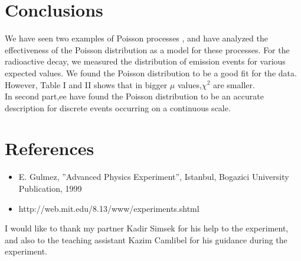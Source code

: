 \documentclass[aps,twocolumn,secnumarabic,nobalancelastpage,amsmath,amssymb,
nofootinbib]{revtex4}
\begin{document}
\section{Conclusions}

We have seen two examples of Poisson processes , and
have analyzed the effectiveness of the Poisson distribution as a model for these processes. For the radioactive decay, we measured the distribution of emission
events for various expected values. We found the Poisson
distribution to be a good fit for the data. However, Table I and II shows that in bigger $\mu$ values,$\chi^2$  are smaller. \\

In second part,ee have found the Poisson distribution to be an accurate description for discrete events occurring on a continuous scale.


\section{References}
\begin{itemize}
\item E. Gulmez, ”Advanced Physics Experiment”, Istanbul, Bogazici University Publication, 1999
\item http://web.mit.edu/8.13/www/experiments.shtml
\end{itemize}






\begin{acknowledgments} I would like to thank my partner Kadir Simsek for his help to the experiment, and also to the teaching assistant Kazim Camlibel for his guidance during the experiment.
\end{acknowledgments}

\end{document}

